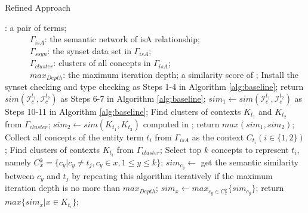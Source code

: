 %
%

\renewcommand\algorithmicrequire{\textbf{Input:}}
\renewcommand\algorithmicensure {\textbf{Output:}}
\begin{algorithm}[th]
\caption{Refined Approach}
\label{alg:refined}
\begin{algorithmic}[1]
\REQUIRE {}: a pair of terms;\\
~~~~~~$\Gamma_{isA}$: the semantic network of isA relationship;\\
~~~~~~$\Gamma_{ssyn}$: the synset data set in $\Gamma_{isA}$;\\
~~~~~~$\Gamma_{cluster}$: clusters of all concepts in $\Gamma_{isA}$;\\
~~~~~~$max_{Depth}$: the maximum iteration depth;
\ENSURE a similarity score of ;
\STATE Install the synset checking and type checking as Steps 1-4 in Algorithm \ref{alg:baseline};
\STATE return $sim(\mathcal{I}_c^{t_1}, \mathcal{I}_c^{t_2})$ as Steps 6-7 in Algorithm \ref{alg:baseline};
\ENDIF
{}
\STATE $sim_1\leftarrow sim(\mathcal{I}_e^{t_1}, \mathcal{I}_e^{t_2})$ as Steps 10-11 in Algorithm \ref{alg:baseline};
\STATE Find clusters of contexts $K_{t_1}$ and $K_{t_2}$ from $\Gamma_{cluster}$;%
\STATE $sim_2\leftarrow sim(K_{t_1}, K_{t_2})$ computed in ;
\STATE return $max(sim_1, sim_2)$;
\ENDIF
{}
\STATE Collect all concepts of the entity term $t_i$ from $\Gamma_{isA}$ as the context $C_{t_i} (i\in\{1, 2\})$;
\STATE Find clusters of contexts $K_{t_i}$ from $\Gamma_{cluster}$;%
\STATE Select top $k$ concepts to represent $t_i$, namely $C{^{k}_{x}}=\{c_y|c_y \neq t_j,c_y\in x, 1\leq y \leq k\}$;
\STATE $sim_{c_y}\leftarrow$ get the semantic similarity between $c_y$ and $t_j$ by repeating this algorithm iteratively if the maximum iteration depth is no more than $max_{Depth}$;
\ENDFOR
\STATE $sim_x\leftarrow max_{c_y\in C{^{k}_{x}}}\{sim_{c_y}\}$;
\ENDFOR
\STATE return $max\{sim_{x}|x\in K_{t_i}\}$;
\ENDIF
\end{algorithmic}
\end{algorithm}



